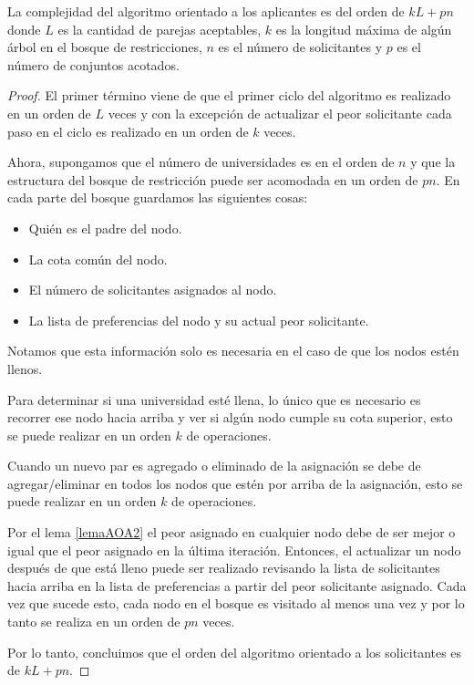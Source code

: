 \begin{teo}
La complejidad del algoritmo orientado a los aplicantes es del orden de $kL+pn$ donde $L$ es la cantidad de parejas aceptables, $k$ es la longitud máxima de algún árbol en el bosque de restricciones, $n$ es el número de solicitantes y $p$ es el número de conjuntos acotados. 
\end{teo}
\begin{proof}
El primer término viene de que el primer ciclo del algoritmo es realizado en un orden de $L$ veces y con la excepción de actualizar el peor solicitante cada paso en el ciclo es realizado en un orden de $k$ veces.  

Ahora, supongamos que el número de universidades es en el orden de $n$ y que la estructura del bosque de restricción puede ser acomodada en un orden de $pn$. En cada parte del bosque guardamos las siguientes cosas:
\begin{itemize}
\item Quién es el padre del nodo. 
\item La cota común del nodo. 
\item El número de solicitantes asignados al nodo.
\item La lista de preferencias del nodo y su actual peor solicitante. 
\end{itemize}
Notamos que esta información solo es necesaria en el caso de que los nodos estén llenos. 

Para determinar si una universidad esté llena, lo único que es necesario es recorrer ese nodo hacia arriba y ver si algún nodo cumple su cota superior, esto se puede realizar en un orden $k$ de operaciones. 

Cuando un nuevo par es agregado o eliminado de la asignación se debe de agregar/eliminar en todos los nodos que estén por arriba de la asignación, esto se puede realizar en un orden $k$ de operaciones. 

Por el lema \ref{lemaAOA2} el peor asignado en cualquier nodo debe de ser mejor o igual que el peor asignado en la última iteración. Entonces, el actualizar un nodo después de que está lleno puede ser realizado revisando la lista de solicitantes hacia arriba en la lista de preferencias a partir del peor solicitante asignado. Cada vez que sucede esto, cada nodo en el bosque es visitado al menos una vez y por lo tanto se realiza en un orden de $pn$ veces.

Por lo tanto, concluimos que el orden del algoritmo orientado a los solicitantes es de $kL+pn$.

\end{proof}


